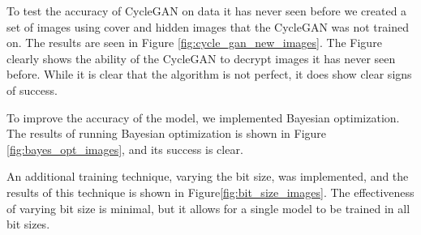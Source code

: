 \documentclass[conference]{IEEEtran}
\begin{document}
To test the accuracy of CycleGAN on data it has never seen before we created a set of images using cover and hidden images that the CycleGAN was not trained on. The results are seen in Figure \ref{fig:cycle_gan_new_images}. The Figure clearly shows the ability of the CycleGAN to decrypt images it has never seen before. While it is clear that the algorithm is not perfect, it does show clear signs of success.

To improve the accuracy of the model, we implemented Bayesian optimization. The results of running Bayesian optimization is shown in Figure \ref{fig:bayes_opt_images}, and its success is clear. 

An additional training technique, varying the bit size, was implemented, and the results of this technique is shown in Figure\ref{fig:bit_size_images}. The effectiveness of varying bit size is minimal, but it allows for a single model to be trained in all bit sizes.
     
\end{document}
